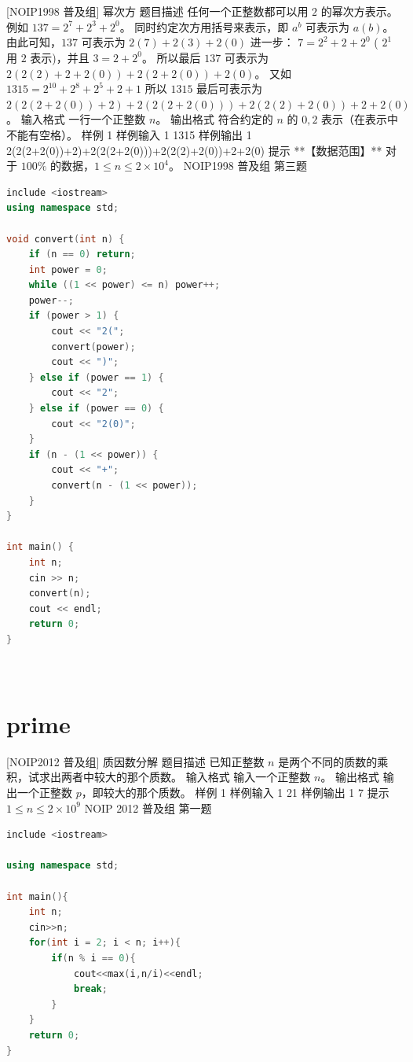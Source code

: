 \documentclass[12pt,twiside,a4paper]{ctexbook}
\numberwithin{chapter}{part}
\begin{document}
\section{}
 [NOIP1998 普及组] 幂次方
 题目描述
任何一个正整数都可以用 $2$ 的幂次方表示。例如 $137=2^7+2^3+2^0 $。
同时约定次方用括号来表示，即 $a^b$ 可表示为 $a(b)$。
由此可知，$137$ 可表示为 $2(7)+2(3)+2(0)$
进一步：
$7= 2^2+2+2^0$  ( $2^1$ 用 $2$ 表示)，并且 $3=2+2^0$。
所以最后 $137$ 可表示为 $2(2(2)+2+2(0))+2(2+2(0))+2(0)$。
又如 $1315=2^{10} +2^8 +2^5 +2+1$
所以 $1315$ 最后可表示为 $2(2(2+2(0))+2)+2(2(2+2(0)))+2(2(2)+2(0))+2+2(0)$。
 输入格式
一行一个正整数 $n$。
 输出格式
符合约定的 $n$ 的 $0, 2$ 表示（在表示中不能有空格）。
 样例 1
 样例输入 1
1315
 样例输出 1
2(2(2+2(0))+2)+2(2(2+2(0)))+2(2(2)+2(0))+2+2(0)
 提示
**【数据范围】**
对于 $100\%$ 的数据，$1 \le n \le 2 \times {10}^4$。
NOIP1998 普及组 第三题
\begin{lstlisting}[language=c++,breaklines=true]
include <iostream>
using namespace std;

void convert(int n) {
    if (n == 0) return;
    int power = 0;
    while ((1 << power) <= n) power++;
    power--;
    if (power > 1) {
        cout << "2(";
        convert(power);
        cout << ")";
    } else if (power == 1) {
        cout << "2";
    } else if (power == 0) {
        cout << "2(0)";
    }
    if (n - (1 << power)) {
        cout << "+";
        convert(n - (1 << power));
    }
}

int main() {
    int n;
    cin >> n;
    convert(n);
    cout << endl;
    return 0;
}
\end{lstlisting}

\section{}
\begin{lstlisting}[language=c++,breaklines=true]

\end{lstlisting}

\section{prime}
 [NOIP2012 普及组] 质因数分解
 题目描述
已知正整数 $n$ 是两个不同的质数的乘积，试求出两者中较大的那个质数。
 输入格式
输入一个正整数 $n$。
 输出格式
输出一个正整数 $p$，即较大的那个质数。
 样例 1
 样例输入 1
21
 样例输出 1
7
 提示
$1 \le n\le 2\times 10^9$
NOIP 2012 普及组 第一题
\begin{lstlisting}[language=c++,breaklines=true]
include <iostream>

using namespace std;

int main(){
	int n;
	cin>>n;
	for(int i = 2; i < n; i++){
		if(n % i == 0){
			cout<<max(i,n/i)<<endl;
			break;
		}
	}
	return 0;
}

\end{lstlisting}
\end{document}
